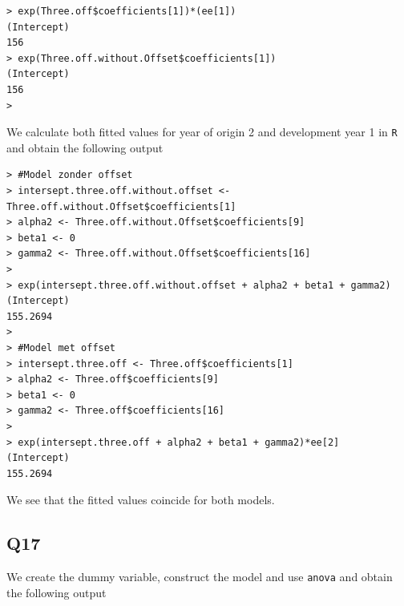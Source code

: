 \documentclass[11pt]{article}
\begin{document}
\begin{verbatim}
> exp(Three.off$coefficients[1])*(ee[1])
(Intercept) 
156 
> exp(Three.off.without.Offset$coefficients[1])
(Intercept) 
156 
>
\end{verbatim}

We calculate both fitted values for year of origin 2 and development year 1 in \verb|R| and obtain the following output 

\begin{verbatim}
> #Model zonder offset
> intersept.three.off.without.offset <- Three.off.without.Offset$coefficients[1]
> alpha2 <- Three.off.without.Offset$coefficients[9]
> beta1 <- 0
> gamma2 <- Three.off.without.Offset$coefficients[16]
> 
> exp(intersept.three.off.without.offset + alpha2 + beta1 + gamma2)
(Intercept) 
155.2694 
> 
> #Model met offset
> intersept.three.off <- Three.off$coefficients[1]
> alpha2 <- Three.off$coefficients[9]
> beta1 <- 0
> gamma2 <- Three.off$coefficients[16]
> 
> exp(intersept.three.off + alpha2 + beta1 + gamma2)*ee[2]
(Intercept) 
155.2694 

\end{verbatim}

We see that the fitted values coincide for both models.
	
\subsection*{Q17}
We create the dummy variable, construct the model and use \verb|anova| and obtain the following output 
\end{document}
